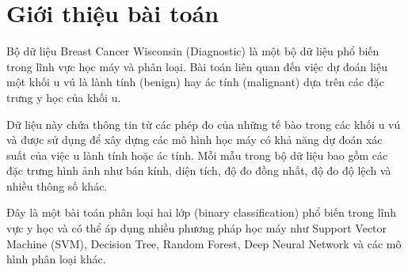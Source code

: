 







%
\IEEEpeerreviewmaketitle



\section{Giới thiệu bài toán}
Bộ dữ liệu Breast Cancer Wisconsin (Diagnostic) \cite{misc_breast_cancer_wisconsin_(diagnostic)_17} là một bộ dữ liệu phổ biến trong lĩnh vực học máy và phân loại. Bài toán liên quan đến việc dự đoán liệu một khối u vú là lành tính (benign) hay ác tính (malignant) dựa trên các đặc trưng y học của khối u.

Dữ liệu này chứa thông tin từ các phép đo của những tế bào trong các khối u vú và được sử dụng để xây dựng các mô hình học máy có khả năng dự đoán xác suất của việc u lành tính hoặc ác tính. Mỗi mẫu trong bộ dữ liệu bao gồm các đặc trưng hình ảnh như bán kính, diện tích, độ đo đồng nhất, độ đo độ lệch và nhiều thông số khác.

Đây là một bài toán phân loại hai lớp (binary classification) phổ biến trong lĩnh vực y học và có thể áp dụng nhiều phương pháp học máy như Support Vector Machine (SVM), Decision Tree, Random Forest, Deep Neural Network và các mô hình phân loại khác.

